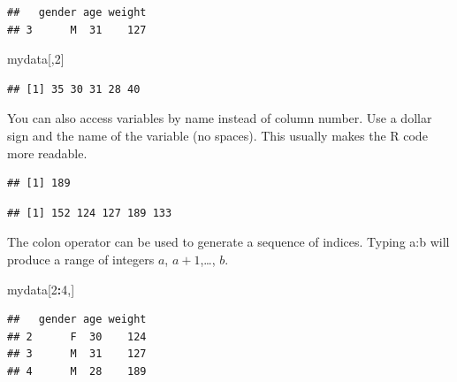 \documentclass[
]{book}
\newenvironment{Shaded}{\begin{snugshade}}{\end{snugshade}}
\newcommand{\DecValTok}[1]{\textcolor[rgb]{0.00,0.00,0.81}{#1}}
\newcommand{\NormalTok}[1]{#1}
\newcommand{\OperatorTok}[1]{\textcolor[rgb]{0.81,0.36,0.00}{\textbf{#1}}}
\begin{document}
\begin{verbatim}
##   gender age weight
## 3      M  31    127
\end{verbatim}

\begin{Shaded}
\begin{Highlighting}[]
\NormalTok{mydata[,}\DecValTok{2}\NormalTok{]}
\end{Highlighting}
\end{Shaded}

\begin{verbatim}
## [1] 35 30 31 28 40
\end{verbatim}

You can also access variables by name instead of column number. Use a dollar sign and the name of the variable (no spaces). This usually makes the R code more readable.

\begin{Shaded}
\end{Shaded}

\begin{verbatim}
## [1] 189
\end{verbatim}

\begin{Shaded}
\end{Shaded}

\begin{verbatim}
## [1] 152 124 127 189 133
\end{verbatim}

The colon operator can be used to generate a sequence of indices. Typing a:b will produce a range of integers \(a\), \(a+1\),\ldots, \(b\).

\begin{Shaded}
\begin{Highlighting}[]
\NormalTok{mydata[}\DecValTok{2}\OperatorTok{:}\DecValTok{4}\NormalTok{,]}
\end{Highlighting}
\end{Shaded}

\begin{verbatim}
##   gender age weight
## 2      F  30    124
## 3      M  31    127
## 4      M  28    189
\end{verbatim}
\end{document}
